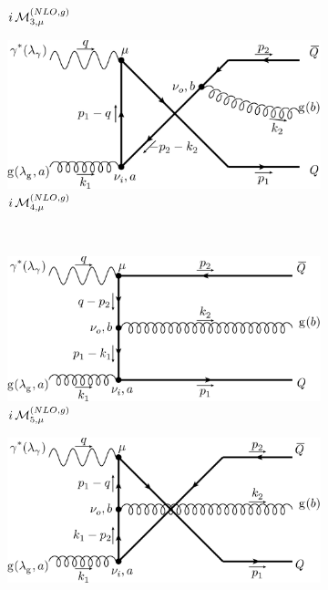\begin{figure}[ht!]
\begin{subfigure}[t]{.42\textwidth}
		\caption{$i\operatorname{\mathcal M}^{(NLO,g)}_{3,\mu}$}
	\end{subfigure}\hspace{.1\textwidth}%
	\begin{subfigure}[t]{.42\textwidth}
		\includegraphics[width=\textwidth]{pyfeyn/nlo-g-4}
		\caption{$i\operatorname{\mathcal M}^{(NLO,g)}_{4,\mu}$}
	\end{subfigure}\\
	\begin{subfigure}[t]{.4\textwidth}
		\includegraphics[width=\textwidth]{pyfeyn/nlo-g-5}
		\caption{$i\operatorname{\mathcal M}^{(NLO,g)}_{5,\mu}$}
	\end{subfigure}\hspace{.15\textwidth}%
	\begin{subfigure}[t]{.4\textwidth}
		\includegraphics[width=\textwidth]{pyfeyn/nlo-g-6}

\end{subfigure}
\end{figure}

